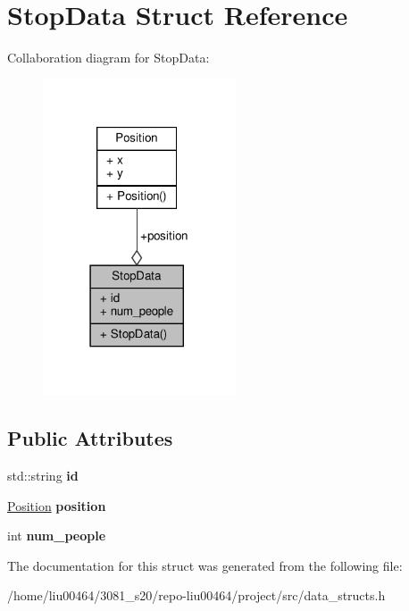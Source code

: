 \hypertarget{structStopData}{}\section{Stop\+Data Struct Reference}
\label{structStopData}


Collaboration diagram for Stop\+Data\+:\nopagebreak
\begin{figure}[H]
\begin{center}
\leavevmode
\includegraphics[width=162pt]{structStopData__coll__graph}
\end{center}
\end{figure}
\subsection*{Public Attributes}
\begin{DoxyCompactItemize}
\item 
\mbox{\label{structStopData_abf63e623637d887c203c2a02b0855bb4}} 
std\+::string {\bfseries id}
\item 
\mbox{\label{structStopData_ae2e45d96bcd5b5f262796a6200a14fda}} 
\hyperlink{structPosition}{Position} {\bfseries position}
\item 
\mbox{\label{structStopData_ac8346b0259972f304061a205d3f75f80}} 
int {\bfseries num\+\_\+people}
\end{DoxyCompactItemize}


The documentation for this struct was generated from the following file\+:\begin{DoxyCompactItemize}
\item 
/home/liu00464/3081\+\_\+s20/repo-\/liu00464/project/src/data\+\_\+structs.\+h\end{DoxyCompactItemize}

